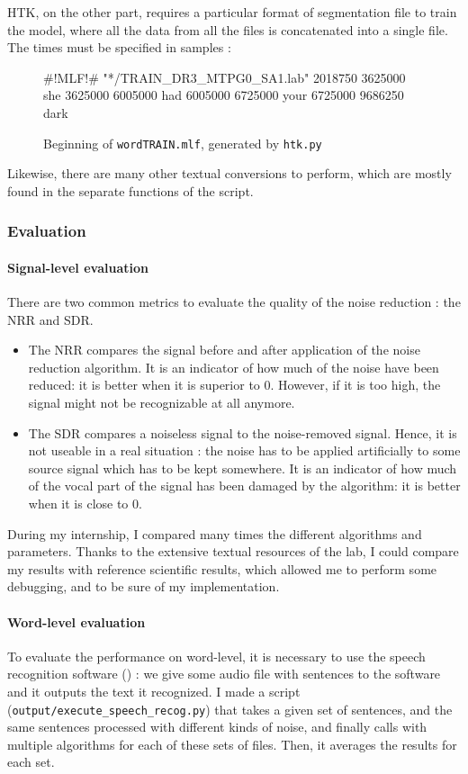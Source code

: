 \newpage
\ac{HTK}, on the other part, requires a particular format of segmentation file to train the model, where all the data from all the files is concatenated into a single file. The times must be specified in samples :
 
\begin{figure}[h]
\centering
\begin{verbbox}
#!MLF!#
"*/TRAIN_DR3_MTPG0_SA1.lab"
2018750 3625000 she
3625000 6005000 had 
6005000 6725000 your 
6725000 9686250 dark 
\end{verbbox}
\theverbbox
\caption{Beginning of \texttt{wordTRAIN.mlf}, generated by \texttt{htk.py}}
\end{figure}

Likewise, there are many other textual conversions to perform, which are mostly found in the separate functions of the script.
\subsubsection{Evaluation}
\paragraph{Signal-level evaluation}
There are two common metrics\cite{horii2013musical} to evaluate the quality of the noise reduction : the \ac{NRR} and \ac{SDR}.
\begin{itemize}
\item The \ac{NRR} compares the signal before and after application of the noise reduction algorithm. It is an indicator of how much of the noise have been reduced: it is better when it is superior to $0$. However, if it is too high, the signal might not be recognizable at all anymore.
\item The \ac{SDR} compares a noiseless signal to the noise-removed signal. Hence, it is not useable in a real situation : the noise has to be applied artificially to some source signal which has to be kept somewhere. It is an indicator of how much of the vocal part of the signal has been damaged by the algorithm: it is better when it is close to $0$.
\end{itemize}

During my internship, I compared many times the different algorithms and parameters. Thanks to the extensive textual resources of the lab, I could compare my results with reference scientific results, which allowed me to perform some debugging, and to be sure of my implementation.
\paragraph{Word-level evaluation}
To evaluate the performance on word-level, it is necessary to use the speech recognition software () : we give some audio file with sentences to the software and it outputs the text it recognized. I made a script (\texttt{output/execute\_speech\_recog.py}) that takes a given set of sentences, and the same sentences processed with different kinds of noise, and finally calls  with multiple algorithms for each of these sets of files. Then, it averages the results for each set.

